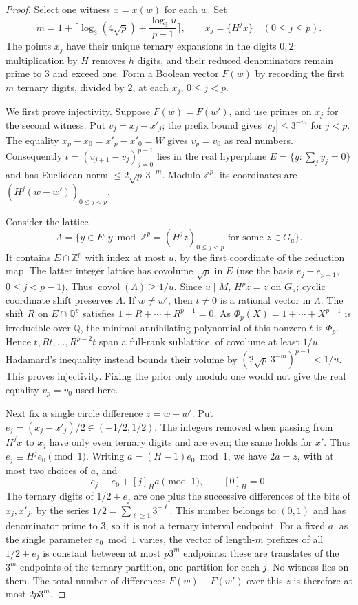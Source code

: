 \begin{proof}
Select one witness \(x=x(w)\) for each \(w\). Set
\[
 m=1+\Big\lceil \log_3(4\sqrt p)+\frac{\log_3 u}{p-1}\Big\rceil,
 \qquad x_j=\{H^j x\}\quad(0\le j\le p).
\]
The points \(x_j\) have their unique ternary expansions in the
digits \(0,2\): multiplication by \(H\) removes \(h\) digits, and
their reduced denominators remain prime to \(3\) and exceed one.
Form a Boolean vector \(F(w)\) by recording the first \(m\) ternary
digits, divided by \(2\), at each \(x_j\), \(0\le j<p\).

We first prove injectivity. Suppose \(F(w)=F(w')\), and use primes
on \(x_j\) for the second witness. Put \(v_j=x_j-x'_j\); the prefix
bound gives \(|v_j|\le 3^{-m}\) for \(j<p\). The equality
\(x_p-x_0=x'_p-x'_0=W\) gives \(v_p=v_0\) as real numbers.
Consequently \(t=(v_{j+1}-v_j)_{j=0}^{p-1}\) lies in the real
hyperplane \(E=\{y:\sum_j y_j=0\}\) and has Euclidean norm
\(\le 2\sqrt p\,3^{-m}\). Modulo \(\mathbb Z^p\), its coordinates
are \((H^j(w-w'))_{0\le j<p}\).

Consider the lattice
\[
 \Lambda=\{y\in E:y\bmod\mathbb Z^p
             =(H^j z)_{0\le j<p}\text{ for some }z\in G_u\}.
\]
It contains \(E\cap\mathbb Z^p\) with index at most \(u\), by the
first coordinate of the reduction map. The latter integer lattice
has covolume \(\sqrt p\) in \(E\) (use the basis \(e_j-e_{p-1}\),
\(0\le j<p-1\)). Thus \(\operatorname{covol}(\Lambda)\ge 1/u\).
Since \(u\mid M\), \(H^p z=z\) on \(G_u\); cyclic coordinate shift
preserves \(\Lambda\). If \(w\ne w'\), then \(t\ne0\) is a rational
vector in \(\Lambda\). The shift \(R\) on \(E\cap\mathbb Q^p\)
satisfies \(1+R+\cdots+R^{p-1}=0\). As
\(\Phi_p(X)=1+\cdots+X^{p-1}\) is irreducible over \(\mathbb Q\),
the minimal annihilating polynomial of this nonzero \(t\) is
\(\Phi_p\). Hence \(t,Rt,\ldots,R^{p-2}t\) span a full-rank
sublattice, of covolume at least \(1/u\). Hadamard's inequality
instead bounds their volume by \((2\sqrt p\,3^{-m})^{p-1}<1/u\).
This proves injectivity. Fixing the prior only modulo one would
not give the real equality \(v_p=v_0\) used here.

Next fix a single circle difference \(z=w-w'\). Put
\(e_j=(x_j-x'_j)/2\in(-1/2,1/2)\).
The integers removed when passing from \(H^j x\) to \(x_j\)
have only even ternary digits and are even; the same holds for
\(x'\). Thus \(e_j\equiv H^j e_0\pmod1\).
Writing \(a=(H-1)e_0\bmod1\), we have \(2a=z\), with at most two
choices of \(a\), and
\[
 e_j\equiv e_0+[j]_H a\pmod1,\qquad [0]_H=0.
\]
The ternary digits of \(1/2+e_j\) are one plus the successive
differences of the bits of \(x_j,x'_j\), by the series
\(1/2=\sum_{\ell\ge1}3^{-\ell}\). This number belongs to \((0,1)\)
and has denominator prime to \(3\), so it is not a ternary interval
endpoint. For a fixed \(a\), as the single parameter \(e_0\bmod1\)
varies, the vector of length-\(m\) prefixes of all \(1/2+e_j\) is
constant between at most \(p3^m\) endpoints: these are translates
of the \(3^m\) endpoints of the ternary partition, one partition for
each \(j\). No witness lies on them. The total number of differences
\(F(w)-F(w')\) over this \(z\) is therefore at most \(2p3^m\).


\end{proof}
